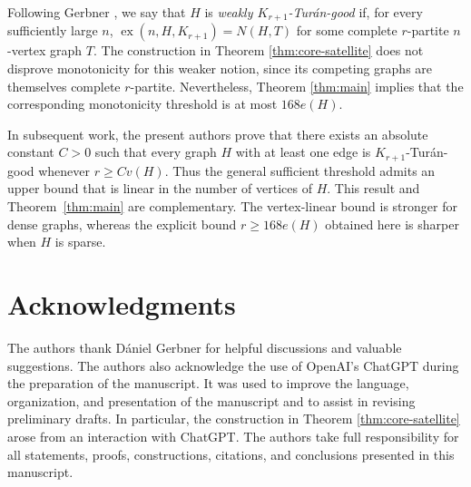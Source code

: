 \documentclass[11pt]{article}
\numberwithin{equation}{section}
\theoremstyle{definition}
\theoremstyle{remark}
\newcommand{\ex}{\operatorname{ex}}
\begin{document}
Following Gerbner \cite{GerbnerWeak}, we say that $H$ is \emph{weakly $K_{r+1}$-Tur\'an-good} if, for every sufficiently large $n$, $\ex(n,H,K_{r+1})=N(H,T)$ for some complete $r$-partite $n$-vertex graph $T$. The construction in Theorem \ref{thm:core-satellite} does not disprove monotonicity for this weaker notion, since its competing graphs are themselves complete $r$-partite. Nevertheless, Theorem \ref{thm:main} implies that the corresponding monotonicity threshold is at most $168e(H)$.

In subsequent work, the present authors prove that there exists an absolute
constant \(C>0\) such that every graph \(H\) with at least one edge is
\(K_{r+1}\)-Tur\'an-good whenever \(r\ge C v(H)\). Thus the general sufficient
threshold admits an upper bound that is linear in the number of vertices of
\(H\). This result and Theorem~\ref{thm:main} are complementary. The
vertex-linear bound is stronger for dense graphs, whereas the explicit bound
\(r\ge 168e(H)\) obtained here is sharper when \(H\) is sparse.
\section*{Acknowledgments}

The authors thank D\'aniel Gerbner for helpful discussions and valuable suggestions. The authors also acknowledge the use of OpenAI's ChatGPT during the preparation of the manuscript. It was used to improve the language, organization, and presentation of the manuscript and to assist in revising preliminary drafts. In particular, the construction in Theorem \ref{thm:core-satellite} arose from an interaction with ChatGPT. The authors take full responsibility for all statements, proofs, constructions, citations, and conclusions presented in this manuscript.
\end{document}
